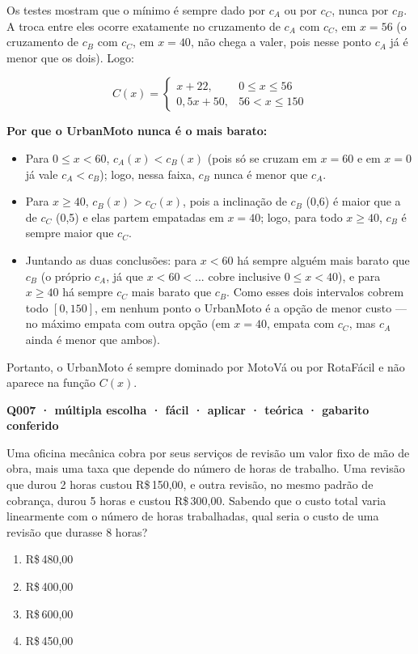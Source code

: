 \documentclass[11pt,a4paper]{article}
\begin{document}
Os testes mostram que o mínimo é sempre dado por $c_A$ ou por $c_C$, nunca por $c_B$. A troca entre eles ocorre exatamente no cruzamento de $c_A$ com $c_C$, em $x=56$ (o cruzamento de $c_B$ com $c_C$, em $x=40$, não chega a valer, pois nesse ponto $c_A$ já é menor que os dois). Logo:

$$C(x)=\begin{cases}x+22, & 0\le x\le 56\\[2mm] 0{,}5x+50, & 56< x\le 150\end{cases}$$

\textbf{Por que o UrbanMoto nunca é o mais barato:}

\begin{itemize}[nosep,leftmargin=*]
\item Para $0\le x<60$, $c_A(x)<c_B(x)$ (pois só se cruzam em $x=60$ e em $x=0$ já vale $c_A<c_B$); logo, nessa faixa, $c_B$ nunca é menor que $c_A$.
\item Para $x\ge 40$, $c_B(x)>c_C(x)$, pois a inclinação de $c_B$ (0,6) é maior que a de $c_C$ (0,5) e elas partem empatadas em $x=40$; logo, para todo $x\ge 40$, $c_B$ é sempre maior que $c_C$.
\item Juntando as duas conclusões: para $x<60$ há sempre alguém mais barato que $c_B$ (o próprio $c_A$, já que $x<60<... $ cobre inclusive $0\le x<40$), e para $x\ge 40$ há sempre $c_C$ mais barato que $c_B$. Como esses dois intervalos cobrem todo $[0,150]$, em nenhum ponto o UrbanMoto é a opção de menor custo — no máximo empata com outra opção (em $x=40$, empata com $c_C$, mas $c_A$ ainda é menor que ambos).
\end{itemize}

Portanto, o UrbanMoto é sempre dominado por MotoVá ou por RotaFácil e não aparece na função $C(x)$.

\bigskip\noindent\textbf{Q007 · múltipla escolha · fácil · aplicar · teórica · gabarito conferido}\par\nopagebreak
Uma oficina mecânica cobra por seus serviços de revisão um valor fixo de mão de obra, mais uma taxa que depende do número de horas de trabalho. Uma revisão que durou 2 horas custou R\$\,150,00, e outra revisão, no mesmo padrão de cobrança, durou 5 horas e custou R\$\,300,00. Sabendo que o custo total varia linearmente com o número de horas trabalhadas, qual seria o custo de uma revisão que durasse 8 horas?
\begin{enumerate}[label=(\alph*)]
\item R\$\,480,00
\item R\$\,400,00
\item R\$\,600,00
\item R\$\,450,00
\end{enumerate}
\end{document}
